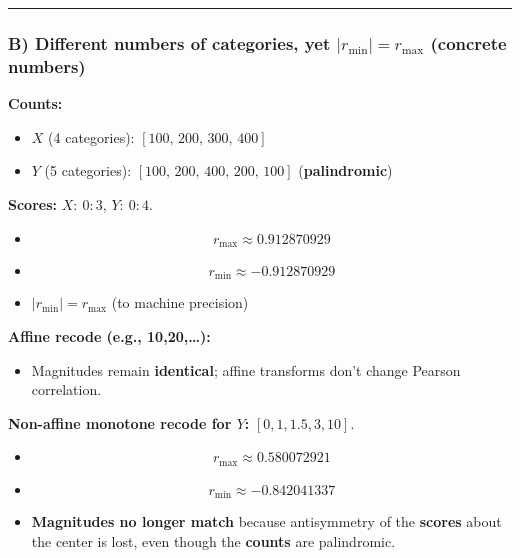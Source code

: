 \documentclass[
  12pt,
]{article}
\providecommand{\tightlist}{%
  \setlength{\itemsep}{0pt}\setlength{\parskip}{0pt}}
\theoremstyle{plain}
\theoremstyle{definition}
\theoremstyle{remark}
\begin{document}
\begin{center}\rule{0.5\linewidth}{0.5pt}\end{center}

\subsubsection{\texorpdfstring{B) \textbf{Different numbers of
categories, yet \(|r_{\min}|=r_{\max}\)} (concrete
numbers)}{B) Different numbers of categories, yet \textbar r\_\{\textbackslash min\}\textbar=r\_\{\textbackslash max\} (concrete numbers)}}\label{b-different-numbers-of-categories-yet-r_minr_max-concrete-numbers}

\textbf{Counts:}

\begin{itemize}
\item
  \(X\) (4 categories): \([100,\,200,\,300,\,400]\)
\item
  \(Y\) (5 categories): \([100,\,200,\,400,\,200,\,100]\)
  (\textbf{palindromic})
\end{itemize}

\textbf{Scores:} \(X:\ 0{:}3\), \(Y:\ 0{:}4\).

\begin{itemize}
\item
  \[r_{\max}\approx 0.912870929\]
\item
  \[r_{\min}\approx -0.912870929\]
\item
  \(|r_{\min}| = r_{\max}\) (to machine precision)
\end{itemize}

\textbf{Affine recode (e.g., 10,20,\ldots):}

\begin{itemize}
\tightlist
\item
  Magnitudes remain \textbf{identical}; affine transforms don't change
  Pearson correlation.
\end{itemize}

\textbf{Non-affine monotone recode for \(Y\):} \([0,1,1.5,3,10]\).

\begin{itemize}
\item
  \[r_{\max}\approx 0.580072921\]
\item
  \[r_{\min}\approx -0.842041337\]
\item
  \textbf{Magnitudes no longer match} because antisymmetry of the
  \textbf{scores} about the center is lost, even though the
  \textbf{counts} are palindromic.
\end{itemize}
\end{document}
